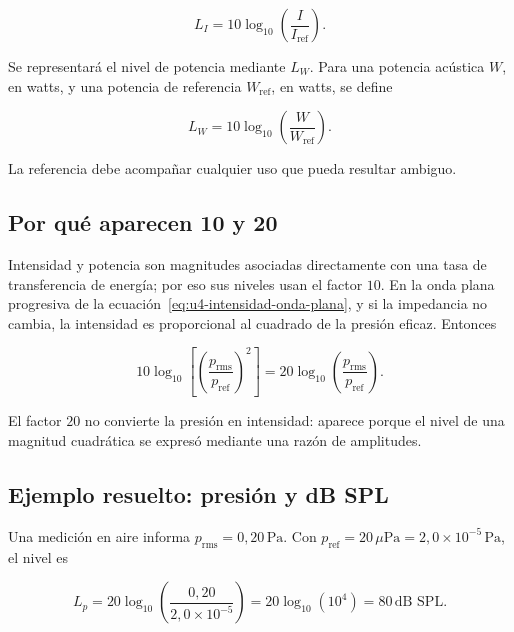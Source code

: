 \begin{equation}
    L_I=10\log_{10}\!\left(\frac{I}{I_\mathrm{ref}}\right).
    \label{eq:u4-nivel-intensidad}
\end{equation}

Se representará el nivel de potencia mediante \(L_W\). Para una potencia
acústica \(W\), en watts, y una potencia de referencia \(W_\mathrm{ref}\), en
watts, se define
\nopagebreak[4]

\begin{equation}
    L_W=10\log_{10}\!\left(\frac{W}{W_\mathrm{ref}}\right).
    \label{eq:u4-nivel-potencia}
\end{equation}

 La referencia debe acompañar cualquier
uso que pueda resultar ambiguo.

\subsection{Por qué aparecen 10 y 20}
\label{sec:u4-factores-logaritmicos}

Intensidad y potencia son magnitudes asociadas directamente con una tasa de
transferencia de energía; por eso sus niveles usan el factor \(10\). En la
onda plana progresiva de la ecuación~\eqref{eq:u4-intensidad-onda-plana}, y si
la impedancia no cambia, la intensidad es proporcional al cuadrado de la
presión eficaz. Entonces

\[
    10\log_{10}\!\left[
       \left(\frac{p_\mathrm{rms}}{p_\mathrm{ref}}\right)^2
    \right]
    =20\log_{10}\!\left(
       \frac{p_\mathrm{rms}}{p_\mathrm{ref}}\right).
\]

El factor \(20\) no convierte la presión en intensidad: aparece porque el
nivel de una magnitud cuadrática se expresó mediante una razón de amplitudes.

\subsection{Ejemplo resuelto: presión y dB SPL}
\label{sec:u4-ejemplo-nivel}

Una medición en aire informa
\(p_\mathrm{rms}=0{,}20\,\text{Pa}\). Con
\(p_\mathrm{ref}=20\,\mu\text{Pa}
=2{,}0\times10^{-5}\,\text{Pa}\), el nivel es

\[
    L_p
      =20\log_{10}\!\left(
       \frac{0{,}20}{2{,}0\times10^{-5}}\right)
      =20\log_{10}(10^4)
      =80\,\text{dB SPL}.
\]

